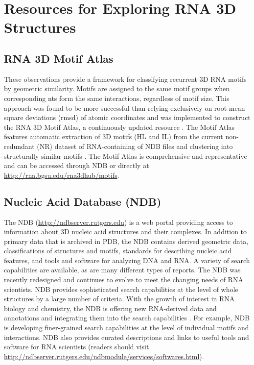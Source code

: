 \section{Resources for Exploring RNA 3D Structures}

\subsection{RNA 3D Motif Atlas}

These observations provide a framework for classifying recurrent 3D RNA motifs
by geometric similarity. Motifs are assigned to the same motif groups when
corresponding nts form the same interactions, regardless of motif size. This
approach was found to be more successful than relying exclusively on root-mean
square deviations (rmsd) of atomic coordinates and was implemented to construct
the RNA 3D Motif Atlas, a continuously updated resource \cite{Petrov2013}. The
Motif Atlas features automatic extraction of 3D motifs (HL and IL) from the
current non-redundant (NR) dataset of RNA-containing of NDB files and clustering
into structurally similar motifs \cite{Petrov2013}. The Motif Atlas is
comprehensive and representative and can be accessed through NDB or directly at
\url{http://rna.bgsu.edu/rna3dhub/motifs}.

\subsection{Nucleic Acid Database (NDB)}

The NDB (\url{http://ndbserver.rutgers.edu}) is a web portal providing access to
information about 3D nucleic acid structures and their complexes. In addition to
primary data that is archived in PDB, the NDB contains derived geometric data,
classifications of structures and motifs, standards for describing nucleic acid
features, and tools and software for analyzing DNA and RNA. A variety of search
capabilities are available, as are many different types of reports. The NDB was
recently redesigned and continues to evolve to meet the changing needs of RNA
scientists. NDB provides sophisticated search capabilities at the level of whole
structures by a large number of criteria. With the growth of interest in RNA
biology and chemistry, the NDB is offering new RNA-derived data and annotations
and integrating them into the search capabilities
\cite{CoimbatoreNarayanan2014}. For example, NDB is developing finer-grained
search capabilities at the level of individual motifs and interactions. NDB also
provides curated descriptions and links to useful tools and software for RNA
scientists (readers should visit
\url{http://ndbserver.rutgers.edu/ndbmodule/services/softwares.html}).

